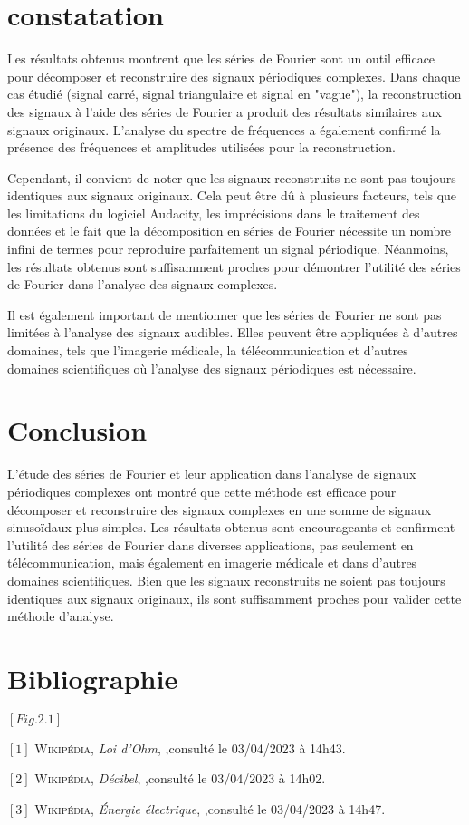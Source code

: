 \documentclass[12pt, letterpaper]{report}
\begin{document}
\chapter{constatation}
Les résultats obtenus montrent que les séries de Fourier sont un outil efficace pour décomposer et reconstruire des signaux périodiques complexes. Dans chaque cas étudié (signal carré, signal triangulaire et signal en "vague"), la reconstruction des signaux à l'aide des séries de Fourier a produit des résultats similaires aux signaux originaux. L'analyse du spectre de fréquences a également confirmé la présence des fréquences et amplitudes utilisées pour la reconstruction.

Cependant, il convient de noter que les signaux reconstruits ne sont pas toujours identiques aux signaux originaux. Cela peut être dû à plusieurs facteurs, tels que les limitations du logiciel Audacity, les imprécisions dans le traitement des données et le fait que la décomposition en séries de Fourier nécessite un nombre infini de termes pour reproduire parfaitement un signal périodique. Néanmoins, les résultats obtenus sont suffisamment proches pour démontrer l'utilité des séries de Fourier dans l'analyse des signaux complexes.

Il est également important de mentionner que les séries de Fourier ne sont pas limitées à l'analyse des signaux audibles. Elles peuvent être appliquées à d'autres domaines, tels que l'imagerie médicale, la télécommunication et d'autres domaines scientifiques où l'analyse des signaux périodiques est nécessaire.
\chapter{Conclusion}
L'étude des séries de Fourier et leur application dans l'analyse de signaux périodiques complexes ont montré que cette méthode est efficace pour décomposer et reconstruire des signaux complexes en une somme de signaux sinusoïdaux plus simples. Les résultats obtenus sont encourageants et confirment l'utilité des séries de Fourier dans diverses applications, pas seulement en télécommunication, mais également en imagerie médicale et dans d'autres domaines scientifiques. Bien que les signaux reconstruits ne soient pas toujours identiques aux signaux originaux, ils sont suffisamment proches pour valider cette méthode d'analyse.
\chapter{Bibliographie}

$[Fig.2.1]$ {}

$[1]$ \textsc{Wikipédia}, \emph{Loi d'Ohm}, \newline
{},\quad consulté le 03/04/2023 à 14h43.
\smallskip

$[2]$ \textsc{Wikipédia}, \emph{Décibel}, \newline
{},\quad consulté le 03/04/2023 à 14h02.
\smallskip

$[3]$ \textsc{Wikipédia}, \emph{Énergie électrique},\newline
{},\quad consulté le 03/04/2023 à 14h47.
\end{document}
